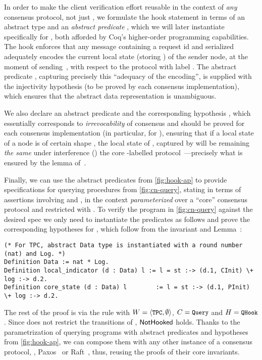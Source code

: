In order to make the client verification effort reusable in the
context of \emph{any} consensus protocol, not just , we
formulate the hook statement in terms of an abstract type 
and an \emph{abstract predicate} , which we will
later instantiate specifically for , both afforded by Coq's
higher-order programming capabilities. The hook enforces that any
message  containing a request id  and serialized
 adequately encodes the current local state (storing
) of the sender node, at the moment of sending~,
with respect to the protocol with label .
%
The abstract predicate , capturing precisely
this ``adequacy of the encoding'', is supplied with the injectivity
hypothesis  (to be proved by each consensus
implementation), which ensures that the abstract data representation
is unambiguous.

We also declare an abstract predicate  and the
corresponding hypothesis , which essentially
corresponds to \emph{irrevocability} of consensus and should be proved
for each consensus implementation (in particular, for ),
ensuring that if a local state of a node  is of certain shape
, the local state of , captured by
 will be remaining \emph{the same} under
interference () \wrt the core -labelled
protocol~---precisely what is ensured by the lemma
 of~.

Finally, we can use the abstract predicates from
\cref{fig:hook-ap} to provide specifications for querying
procedures from \cref{fig:cn-query}, stating  in
terms of assertions involving  and
, in the context \emph{parameterized} over a
``core'' consensus protocol  and restricted with
.
%
To verify the program in \cref{fig:cn-query} against the desired
spec we only need to instantiate the predicates as follows and prove
the corresponding hypotheses for , which follow from the
invariant  and Lemma~:

\begin{lstlisting}[basicstyle=\footnotesize\ttfamily]
(* For TPC, abstract Data type is instantiated with a round number (nat) and Log. *)
Definition Data := nat * Log.
Definition local_indicator (d : Data) l := l = st :-> (d.1, CInit) \+ log :-> d.2.
Definition core_state (d : Data) l        := l = st :-> (d.1, PInit) \+ log :-> d.2.
\end{lstlisting}
%
The rest of the proof is via the  rule with
$W = \angled{\text{\code{TPC}}, \emptyset}$, $C = \text{\code{Query}}$ and
$H = \text{\code{QHook}}$. Since  does not restrict the
transitions of , $\mathsf{NotHooked}$ holds.
%
Thanks to the parametrization of querying programs with abstract
predicates and hypotheses from \cref{fig:hook-ap}, we can compose
them with any other instance of a consensus protocol, \eg,
Paxos~\cite{Lamport:TOPLAS98} or Raft~\cite{ongaro:raft},
thus, reusing the proofs of their core invariants.

